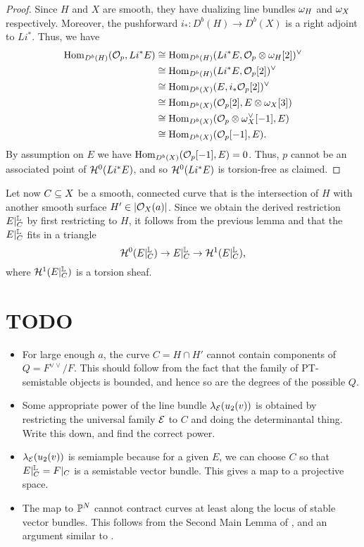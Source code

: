\documentclass[letterpaper,10pt]{article}
\theoremstyle{remark}
\begin{document}
\begin{proof}
Since $H$ and $X$ are smooth, they have dualizing line bundles $\omega_H$ and $\omega_X$ respectively. Moreover, the pushforward $i_*: D^b(H) \to D^b(X)$ is a right adjoint to $L i^*$. Thus, we have
\begin{align*}
    \mathrm{Hom}_{D^b(H)}(\mathcal{O}_p, L i^* E) & \cong \mathrm{Hom}_{D^b(H)}(L i^* E, \mathcal{O}_p \otimes \omega_H[2])^\vee \\
    & \cong \mathrm{Hom}_{D^b(H)}(L i^* E, \mathcal{O}_p[2])^\vee \\
    & \cong \mathrm{Hom}_{D^b(X)}(E, i_*\mathcal{O}_p[2])^\vee \\
    & \cong \mathrm{Hom}_{D^b(X)}(\mathcal{O}_p[2], E \otimes \omega_X[3]) \\
    & \cong \mathrm{Hom}_{D^b(X)}(\mathcal{O}_p \otimes \omega_X^\vee[-1], E) \\
    & \cong \mathrm{Hom}_{D^b(X)}(\mathcal{O}_p[-1], E).
\end{align*}
By assumption on $E$ we have $\mathrm{Hom}_{D^b(X)}(\mathcal{O}_p[-1], E) = 0$. Thus, $p$ cannot be an associated point of $\mathcal{H}^0(L i^* E)$, and so $\mathcal{H}^0(L i^* E)$ is torsion-free as claimed.
\end{proof}

Let now $C \subseteq X$ be a smooth, connected curve that is the intersection of $H$ with another smooth surface $H' \in |\mathcal{O}_X(a)|$. Since we obtain the derived restriction $E|^{\mathbb{L}}_C$ by first restricting to $H$, it follows from the previous lemma and \cite[Lemma 6.3]{t} that the $E|^{\mathbb{L}}_C$ fits in a triangle
\[ \mathcal{H}^0(E|^{\mathbb{L}}_C) \to E|^{\mathbb{L}}_C \to \mathcal{H}^1(E|^{\mathbb{L}}_C), \]
where $\mathcal{H}^1(E|^{\mathbb{L}}_C)$ is a torsion sheaf.

\section{TODO}
\begin{itemize}
    \item For large enough $a$, the curve $C = H \cap H'$ cannot contain components of $Q = F^{\vee\vee}/F$. This should follow from the fact that the family of PT-semistable objects is bounded, and hence so are the degrees of the possible $Q$.
    \item Some appropriate power of the line bundle $\lambda_{\mathcal{E}}(u_2(v))$ is obtained by restricting the universal family $\mathcal{E}$ to $C$ and doing the determinantal thing. Write this down, and find the correct power.
    \item $\lambda_{\mathcal{E}}(u_2(v))$ is semiample because for a given $E$, we can choose $C$ so that $E|^{\mathbb{L}}_C = F|_C$ is a semistable vector bundle. This gives a map to a projective space.
    \item The map to $\mathbb{P}^N$ cannot contract curves at least along the locus of stable vector bundles. This follows from the Second Main Lemma of \cite{seshadri}, and an argument similar to \cite[Lemma 8.2.12]{HL}.
\end{itemize}
\end{document}
